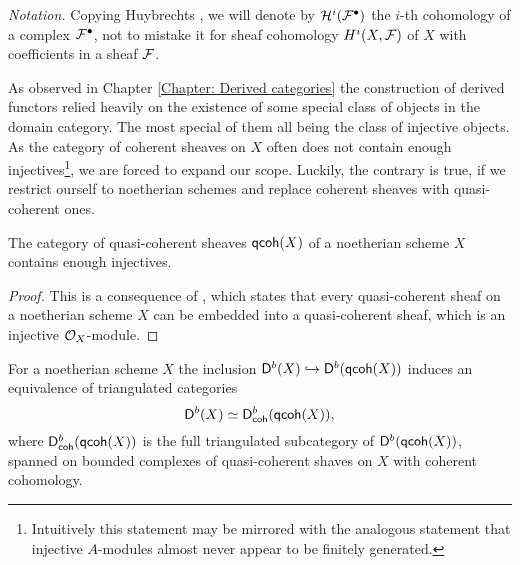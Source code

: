 \vspace{0.3cm}
\noindent
\textsl{Notation.}
Copying Huybrechts \cite{huybrechts2006fouriermukai}, we will denote by $\mathcal H^i(\mathcal F^\bullet)$ the $i$-th cohomology of a complex $\mathcal F^\bullet$, not to mistake it for sheaf cohomology $H^{i}(X, \mathcal F)$ of $X$ with coefficients in a sheaf $\mathcal F$.

\vspace{0.3cm}

As observed in Chapter \ref{Chapter: Derived categories} the construction of derived functors relied heavily on the existence of some special class of objects in the domain category. The most special of them all being the class of injective objects. As the category of coherent sheaves on $X$ often does not contain enough injectives\footnote{Intuitively this statement may be mirrored with the analogous statement that injective $A$-modules almost never appear to be finitely generated.}, we are forced to expand our scope. Luckily, the contrary is true, if we restrict ourself to noetherian schemes and replace coherent sheaves with quasi-coherent ones. 

\begin{proposition}
    \label{qcoh of noetherian scheme contains enough injectives}
    The category of quasi-coherent sheaves $\mathsf{qcoh}(X)$ of a noetherian scheme $X$ contains enough injectives.
\end{proposition}

\begin{proof}
    This is a consequence of \cite[\S II, Theorem 7.18]{Hartshorne1966},  which states that every quasi-coherent sheaf on a noetherian scheme $X$ can be embedded into a quasi-coherent sheaf, which is an injective ${\mathcal{O}_{X}}$-module. 
\end{proof}

\begin{proposition}
    \label{Db(X) is bounded derived of quasi-coherent with coherent cohomology}
    For a noetherian scheme $X$ the inclusion $\mathsf{D}^b(X) \hookrightarrow \mathsf{D}^b(\mathsf{qcoh}(X))$ induces an equivalence of triangulated categories
    \[
        \mathsf{D}^b(X) \simeq \mathsf{D}^b_{\mathsf{coh}}(\mathsf{qcoh}(X)),
    \]
    where $\mathsf{D}^b_{\mathsf{coh}}(\mathsf{qcoh}(X))$ is the full triangulated subcategory of $\mathsf{D}^b(\mathsf{qcoh}(X))$, spanned on bounded complexes of quasi-coherent shaves on $X$ with coherent cohomology.
\end{proposition}

